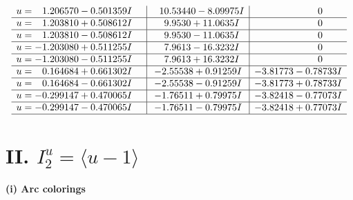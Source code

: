 \documentclass[1p]{elsarticle_modified}
\theoremstyle{definition}
\begin{document}
$$\begin{array}{c|c|c}
\begin{aligned}
u &= \phantom{-}1.206570 - 0.501359 I\end{aligned}
 & \phantom{-}10.53440 - 8.09975 I & \phantom{-0.000000 } 0 \\ \hline\begin{aligned}
u &= \phantom{-}1.203810 + 0.508612 I\end{aligned}
 & \phantom{-}9.9530 + 11.0635 I & \phantom{-0.000000 } 0 \\ \hline\begin{aligned}
u &= \phantom{-}1.203810 - 0.508612 I\end{aligned}
 & \phantom{-}9.9530 - 11.0635 I & \phantom{-0.000000 } 0 \\ \hline\begin{aligned}
u &= -1.203080 + 0.511255 I\end{aligned}
 & \phantom{-}7.9613 - 16.3232 I & \phantom{-0.000000 } 0 \\ \hline\begin{aligned}
u &= -1.203080 - 0.511255 I\end{aligned}
 & \phantom{-}7.9613 + 16.3232 I & \phantom{-0.000000 } 0 \\ \hline\begin{aligned}
u &= \phantom{-}0.164684 + 0.661302 I\end{aligned}
 & -2.55538 + 0.91259 I & -3.81773 - 0.78733 I \\ \hline\begin{aligned}
u &= \phantom{-}0.164684 - 0.661302 I\end{aligned}
 & -2.55538 - 0.91259 I & -3.81773 + 0.78733 I \\ \hline\begin{aligned}
u &= -0.299147 + 0.470065 I\end{aligned}
 & -1.76511 + 0.79975 I & -3.82418 - 0.77073 I \\ \hline\begin{aligned}
u &= -0.299147 - 0.470065 I\end{aligned}
 & -1.76511 - 0.79975 I & -3.82418 + 0.77073 I\\
 \hline 
 \end{array}$$\newpage\newpage\renewcommand{\arraystretch}{1}
\centering \section*{II. $I^u_{2}= \langle u-1 \rangle$}
\flushleft \textbf{(i) Arc colorings}\\
\end{document}
